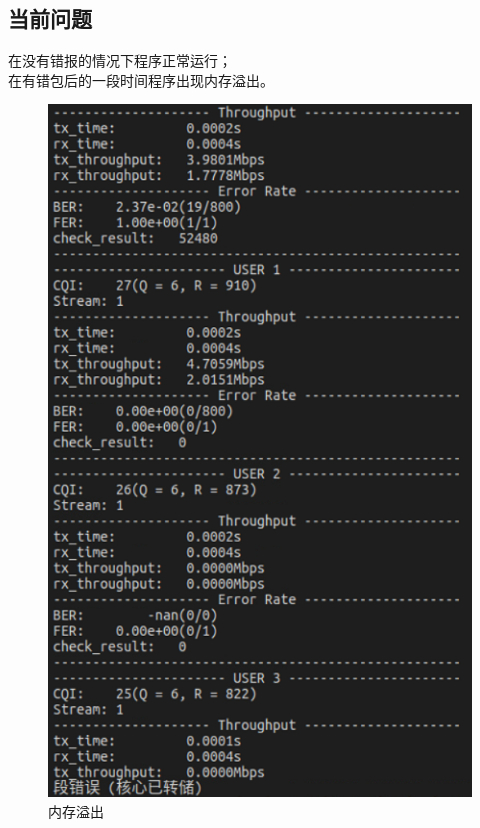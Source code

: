 \documentclass{article}
\begin{document}
\subsection{当前问题}
在没有错报的情况下程序正常运行；\\
在有错包后的一段时间程序出现内存溢出。
\begin{figure}[H]
	\centering
	\includegraphics[width = .6\textwidth]{err.png}
	\caption{内存溢出}
\end{figure}



\end{document}
